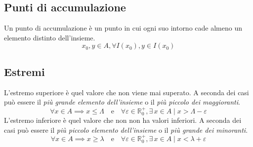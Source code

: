\subsection{Punti di accumulazione}
Un punto di accumulazione è un punto in cui ogni suo intorno cade almeno un elemento distinto 
dell'insieme.
\begin{equation*}
  x_0,y\in A,\forall I(x_0), y\in I(x_0)
\end{equation*}

\subsection{Estremi}
L'estremo superiore è quel valore che non viene mai superato. A seconda dei casi può essere il 
\emph{più grande elemento dell'insieme} o il \emph{più piccolo dei maggioranti}.
\begin{equation*}
  \forall x\in A\implies x\leq\Lambda\quad\text{e}\quad \forall\varepsilon\in\mathbb{R}_0^+,
  \exists\,x\in A\mid x>\Lambda-\varepsilon
\end{equation*}
L'estremo inferiore è quel valore che non non ha valori inferiori. A seconda dei casi può essere il
\emph{più piccolo elemento dell'insieme} o il \emph{più grande dei minoranti}.
\begin{equation*}
  \forall x\in A\implies x\geq\lambda\quad\text{e}\quad \forall\varepsilon\in\mathbb{R}_0^+,
  \exists\,x\in A\mid x<\lambda+\varepsilon
\end{equation*}
